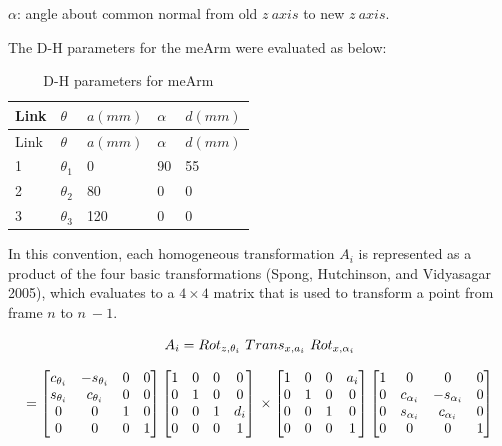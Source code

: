 \documentclass[
  letterpaper,
  DIV=11,
  numbers=noendperiod]{scrreprt}
\begin{document}
\(\alpha\): angle about common normal from old \(z\ axis\) to new
\(z\ axis\).

The D-H parameters for the meArm were evaluated as below:

\begin{longtable}[]{@{}lllll@{}}
\caption{D-H parameters for meArm}\tabularnewline
\toprule()
Link & \(\theta\) & \(a(mm)\) & \(\alpha\) & \(d(mm)\) \\
\midrule()
\endfirsthead
\toprule()
Link & \(\theta\) & \(a(mm)\) & \(\alpha\) & \(d(mm)\) \\
\midrule()
\endhead
1 & \(\theta_1\) & 0 & 90 & 55 \\
2 & \(\theta_2\) & 80 & 0 & 0 \\
3 & \(\theta_3\) & 120 & 0 & 0 \\
\bottomrule()
\end{longtable}

In this convention, each homogeneous transformation \(A_i\) is
represented as a product of the four basic transformations (Spong,
Hutchinson, and Vidyasagar 2005), which evaluates to a \(4\times4\)
matrix that is used to transform a point from frame \(n\) to \(n\ -1\).

\[
A_i = Rot_{z, \theta_i}\ Trans_{x, a_i}\ Rot_{x, \alpha_i} \\
\]

\[
= \begin{bmatrix}
c_{\theta_i} & -s_{\theta_i} & 0 & 0 \\
s_{\theta_i} & c_{\theta_i} & 0 & 0 \\
0 & 0 & 1 & 0 \\
0 & 0 & 0 & 1
\end{bmatrix} 
\begin{bmatrix}
1 & 0 & 0 & 0 \\
0 & 1 & 0 & 0 \\
0 & 0 & 1 & d_i \\
0 & 0 & 0 & 1
\end{bmatrix}\\
\times \begin{bmatrix}
1 & 0 & 0 & a_i \\
0 & 1 & 0 & 0 \\
0 & 0 & 1 & 0 \\
0 & 0 & 0 & 1
\end{bmatrix}
\begin{bmatrix}
1 & 0 & 0 & 0 \\
0 & c_{\alpha_i} & -s_{\alpha_i} & 0 \\
0 & s_{\alpha_i} & c_{\alpha_i} & 0 \\
0 & 0 & 0 & 1
\end{bmatrix}
\]
\end{document}
